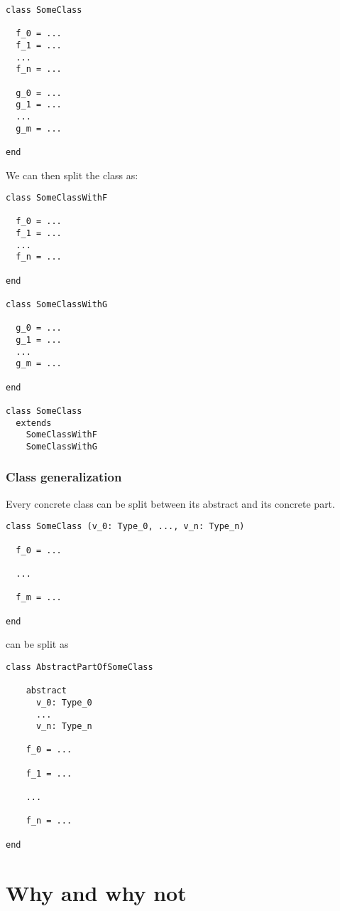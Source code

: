 \begin{lstlisting}[label={lst:rewritingClassSplitBefore}]
class SomeClass

  f_0 = ...
  f_1 = ...
  ...
  f_n = ...

  g_0 = ...
  g_1 = ...
  ...
  g_m = ...

end
\end{lstlisting}

We can then split the class as:

\begin{lstlisting}[label={lst:rewritingClassSplitAfter}]
class SomeClassWithF

  f_0 = ...
  f_1 = ...
  ...
  f_n = ...

end

class SomeClassWithG

  g_0 = ...
  g_1 = ...
  ...
  g_m = ...

end

class SomeClass
  extends
    SomeClassWithF
    SomeClassWithG
\end{lstlisting}

\subsubsection{Class generalization}

Every concrete class can be split between its abstract and its concrete part.

\begin{lstlisting}[label={lst:rewritingClassGeneralizationBefore}]
class SomeClass (v_0: Type_0, ..., v_n: Type_n)

  f_0 = ...

  ...

  f_m = ...

end
\end{lstlisting}

can be split as

\begin{lstlisting}[label={lst:rewritingClassGeneralizationAfter}]
class AbstractPartOfSomeClass

    abstract
      v_0: Type_0
      ...
      v_n: Type_n

    f_0 = ...

    f_1 = ...

    ...

    f_n = ...

end
\end{lstlisting}


\section{Why and why not}

